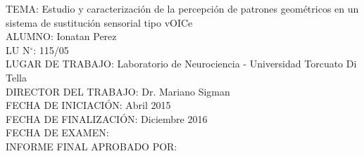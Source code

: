 \documentclass{article}
\numberwithin{figure}{section}
\begin{document}
\newpage\null
\thispagestyle{empty}
\newpage

\begin{flushleft}
\thispagestyle{empty}
TEMA: Estudio y caracterización de la percepción de patrones geométricos en un sistema de sustitución sensorial tipo vOICe\\

ALUMNO: Ionatan Perez\\

LU N$^{\circ}$: 115/05 \\

LUGAR DE TRABAJO: Laboratorio de Neurociencia - Universidad Torcuato Di Tella\\

DIRECTOR DEL TRABAJO: Dr. Mariano Sigman\\

FECHA DE INICIACIÓN: Abril 2015 \\

FECHA DE FINALIZACIÓN: Diciembre 2016\\

FECHA DE EXAMEN: \\

INFORME FINAL APROBADO POR:
\end{flushleft}                                                              %
\vspace{2cm}
\end{document}
